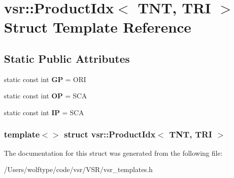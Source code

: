 \hypertarget{structvsr_1_1_product_idx_3_01_t_n_t_00_01_t_r_i_01_4}{\section{vsr\-:\-:Product\-Idx$<$ T\-N\-T, T\-R\-I $>$ Struct Template Reference}
\label{structvsr_1_1_product_idx_3_01_t_n_t_00_01_t_r_i_01_4}
}
\subsection*{Static Public Attributes}
\begin{DoxyCompactItemize}
\item 
\hypertarget{structvsr_1_1_product_idx_3_01_t_n_t_00_01_t_r_i_01_4_ab2d3b3f616dedf5c4b4fe0a5ef6d5edf}{static const int {\bfseries G\-P} = O\-R\-I}\label{structvsr_1_1_product_idx_3_01_t_n_t_00_01_t_r_i_01_4_ab2d3b3f616dedf5c4b4fe0a5ef6d5edf}

\item 
\hypertarget{structvsr_1_1_product_idx_3_01_t_n_t_00_01_t_r_i_01_4_adddc4884f792d5d257cefcc33827d733}{static const int {\bfseries O\-P} = S\-C\-A}\label{structvsr_1_1_product_idx_3_01_t_n_t_00_01_t_r_i_01_4_adddc4884f792d5d257cefcc33827d733}

\item 
\hypertarget{structvsr_1_1_product_idx_3_01_t_n_t_00_01_t_r_i_01_4_a921fd6e3eae11045b3304669fab729b1}{static const int {\bfseries I\-P} = S\-C\-A}\label{structvsr_1_1_product_idx_3_01_t_n_t_00_01_t_r_i_01_4_a921fd6e3eae11045b3304669fab729b1}

\end{DoxyCompactItemize}
\subsubsection*{template$<$$>$ struct vsr\-::\-Product\-Idx$<$ T\-N\-T, T\-R\-I $>$}



The documentation for this struct was generated from the following file\-:\begin{DoxyCompactItemize}
\item 
/\-Users/wolftype/code/vsr/\-V\-S\-R/vsr\-\_\-templates.\-h\end{DoxyCompactItemize}
